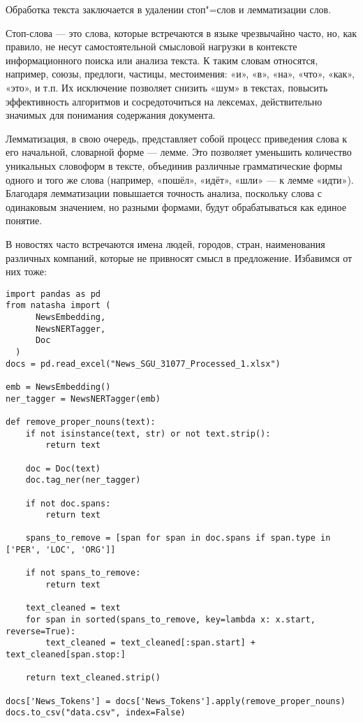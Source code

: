 \documentclass[coursework]{SCWorks}
\begin{document}
Обработка текста заключается в удалении стоп"=слов и лемматизации слов.

Стоп-слова — это слова, которые встречаются в языке чрезвычайно часто, но, как правило, не несут самостоятельной смысловой нагрузки в контексте информационного поиска или анализа текста. К таким словам относятся, например, союзы, предлоги, частицы, местоимения: «и», «в», «на», «что», «как», «это», и т.п. Их исключение позволяет снизить «шум» в текстах, повысить эффективность алгоритмов и сосредоточиться на лексемах, действительно значимых для понимания содержания документа.
  
Лемматизация, в свою очередь, представляет собой процесс приведения слова к его начальной, словарной форме — лемме. Это позволяет уменьшить количество уникальных словоформ в тексте, объединив различные грамматические формы одного и того же слова (например, «пошёл», «идёт», «шли» — к лемме «идти»). Благодаря лемматизации повышается точность анализа, поскольку слова с одинаковым значением, но разными формами, будут обрабатываться как единое понятие.

В новостях часто встречаются имена людей, городов, стран, наименования различных компаний, которые не привносят смысл в предложение. Избавимся от них тоже:
\begin{verbatim}
import pandas as pd
from natasha import (
      NewsEmbedding,
      NewsNERTagger,
      Doc
  )
docs = pd.read_excel("News_SGU_31077_Processed_1.xlsx")

emb = NewsEmbedding()
ner_tagger = NewsNERTagger(emb)

def remove_proper_nouns(text):
    if not isinstance(text, str) or not text.strip():
        return text
    
    doc = Doc(text)
    doc.tag_ner(ner_tagger)
    
    if not doc.spans:
        return text
        
    spans_to_remove = [span for span in doc.spans if span.type in ['PER', 'LOC', 'ORG']]
    
    if not spans_to_remove:
        return text
        
    text_cleaned = text
    for span in sorted(spans_to_remove, key=lambda x: x.start, reverse=True):
        text_cleaned = text_cleaned[:span.start] + text_cleaned[span.stop:]
        
    return text_cleaned.strip()
    
docs['News_Tokens'] = docs['News_Tokens'].apply(remove_proper_nouns)
docs.to_csv("data.csv", index=False)
\end{verbatim}
\end{document}
